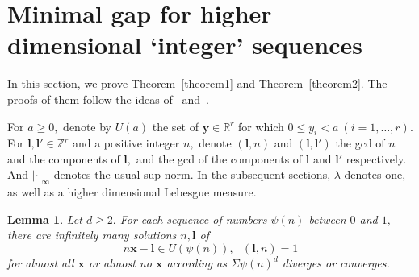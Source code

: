 \documentclass[12pt,article]{amsart}
\newtheorem{lemma}[theorem]{Lemma}
\theoremstyle{remark}
\numberwithin{equation}{section}
\newcommand{\R}{\mathbb{R}}
\newcommand{\Z}{\mathbb{Z}}
\newcommand{\boldx}{\boldsymbol{x}}
\begin{document}
	
	\section{Minimal gap for higher dimensional `integer' sequences}
	In this section, we prove Theorem~\ref{theorem1} and Theorem~\ref{theorem2}. The proofs of them follow the ideas of~\cite{Rudnick2018minimalgap} and~\cite{Aistleitner2021minimalgap}.
	
	For $a\geq 0,$ denote by $U(a)$ the set of $\boldsymbol{y}\in\R^r$ for which $0\leq y_i<a\:(i=1,\dots,r).$ For $\boldsymbol{l},\boldsymbol{l'}\in\Z^r$ and a positive integer $n,$ denote $(\boldsymbol{l},n)$ and $(\boldsymbol{l},\boldsymbol{l'})$ the gcd of $n$ and the components of $\boldsymbol{l},$ and the gcd of the components of  $\boldsymbol{l}$ and $\boldsymbol{l'}$ respectively. And $|\cdot|_\infty$ denotes the usual sup norm. In the subsequent sections, $\lambda$ denotes one, as well as a higher dimensional Lebesgue measure.
	\begin{lemma}{\cite[Theorem 1]{Gllaghar}}\label{gallaghar lemma}
		Let $d\geq 2.$ For each sequence of numbers $\psi(n)$ between $0$ and $1,$ there are infinitely many solutions $n,\boldsymbol{l}$ of 	
		\[n\boldx-\boldsymbol{l}\in U(\psi(n)),\:\:\: (\boldsymbol{l},n)=1\]
		for almost all $\boldx$ or almost no $\boldx$ according as $\Sigma \psi(n)^d$ diverges or converges.
	\end{lemma}
\end{document}
